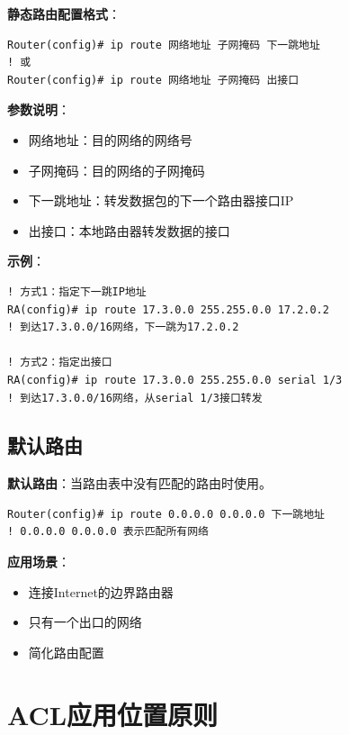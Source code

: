 \documentclass[12pt,a4paper]{ctexart}
\begin{document}
\begin{cmdbox}
\textbf{静态路由配置格式}：
\begin{lstlisting}
Router(config)# ip route 网络地址 子网掩码 下一跳地址
! 或
Router(config)# ip route 网络地址 子网掩码 出接口
\end{lstlisting}

\textbf{参数说明}：
\begin{itemize}[itemsep=0pt]
    \item 网络地址：目的网络的网络号
    \item 子网掩码：目的网络的子网掩码
    \item 下一跳地址：转发数据包的下一个路由器接口IP
    \item 出接口：本地路由器转发数据的接口
\end{itemize}

\textbf{示例}：
\begin{lstlisting}
! 方式1：指定下一跳IP地址
RA(config)# ip route 17.3.0.0 255.255.0.0 17.2.0.2
! 到达17.3.0.0/16网络，下一跳为17.2.0.2

! 方式2：指定出接口
RA(config)# ip route 17.3.0.0 255.255.0.0 serial 1/3
! 到达17.3.0.0/16网络，从serial 1/3接口转发
\end{lstlisting}
\end{cmdbox}

\subsection{默认路由}

\begin{keybox}
\textbf{默认路由}：当路由表中没有匹配的路由时使用。

\begin{lstlisting}
Router(config)# ip route 0.0.0.0 0.0.0.0 下一跳地址
! 0.0.0.0 0.0.0.0 表示匹配所有网络
\end{lstlisting}

\textbf{应用场景}：
\begin{itemize}[itemsep=0pt]
    \item 连接Internet的边界路由器
    \item 只有一个出口的网络
    \item 简化路由配置
\end{itemize}
\end{keybox}

\section{ACL应用位置原则}
\end{document}
